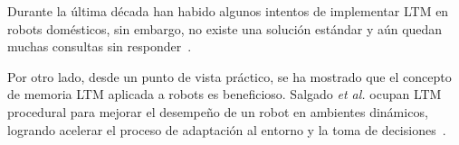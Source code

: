 Durante la última década han habido algunos intentos de implementar LTM en robots domésticos, sin embargo, no existe una solución estándar y aún quedan muchas consultas sin responder~\cite{ltm_in_robocup}.

Por otro lado, desde un punto de vista práctico, se ha mostrado que el concepto de memoria LTM aplicada a robots es beneficioso. Salgado \textit{et al.} ocupan LTM procedural para mejorar el desempeño de un robot en ambientes dinámicos, logrando acelerar el proceso de adaptación al entorno y la toma de decisiones~\cite{Salgado2012}.


%
%
%
